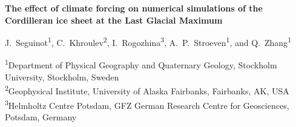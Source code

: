 \documentclass[12pt]{article}
\begin{document}
\textbf{The effect of climate forcing on numerical simulations of the Cordilleran ice sheet at the Last Glacial Maximum}

J.~Seguinot\textsuperscript{1},
C.~Khroulev\textsuperscript{2},
I.~Rogozhina\textsuperscript{3},
A.~P.~Stroeven\textsuperscript{1},
and Q.~Zhang\textsuperscript{1}

\textsuperscript{1}Department of Physical Geography and Quaternary Geology, Stockholm University, Stockholm, Sweden \\
\textsuperscript{2}Geophysical Institute, University of Alaska Fairbanks, Fairbanks, AK, USA \\
\textsuperscript{3}Helmholtz Centre Potsdam, GFZ German Research Centre for Geosciences, Potsdam, Germany


\end{document}
